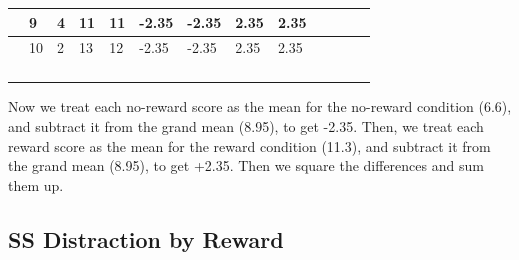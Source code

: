 \documentclass[
]{book}
\begin{document}
\begin{table}
\begin{tabular}{l|l|l|l|l|l|l|l|l|>{}l|>{}l|>{}l|>{}l}
\hline
 & 9 & 4 & 11 & 11 & -2.35 & -2.35 & 2.35 & 2.35 & \cellcolor{yellow}{5.5225} & \cellcolor{yellow}{5.5225} & \cellcolor{yellow}{5.5225} & \cellcolor{yellow}{5.5225}\\
\hline
 & 10 & 2 & 13 & 12 & -2.35 & -2.35 & 2.35 & 2.35 & \cellcolor{yellow}{5.5225} & \cellcolor{yellow}{5.5225} & \cellcolor{yellow}{5.5225} & \cellcolor{yellow}{5.5225}\\
\hline
\cellcolor{lightgreen}{Means} & \cellcolor{lightgreen}{9.6} & \cellcolor{lightgreen}{3.6} & \cellcolor{lightgreen}{12.6} & \cellcolor{lightgreen}{10} & \cellcolor{lightgreen}{} & \cellcolor{lightgreen}{} & \cellcolor{lightgreen}{} & \cellcolor{lightgreen}{} & \cellcolor{yellow}{} & \cellcolor{yellow}{} & \cellcolor{yellow}{} & \cellcolor{yellow}{}\\
\hline
\cellcolor{lightgreen}{Grand Mean} & \cellcolor{lightgreen}{8.95} & \cellcolor{lightgreen}{No Reward} & \cellcolor{lightgreen}{6.6} & \cellcolor{lightgreen}{Reward} & \cellcolor{lightgreen}{11.3} & \cellcolor{lightgreen}{} & \cellcolor{lightgreen}{} & \cellcolor{lightgreen}{} & \cellcolor{yellow}{} & \cellcolor{yellow}{} & \cellcolor{yellow}{} & \cellcolor{yellow}{}\\
\hline
\cellcolor{yellow}{sums} & \cellcolor{yellow}{} & \cellcolor{yellow}{} & \cellcolor{yellow}{} & \cellcolor{yellow}{} & \cellcolor{yellow}{} & \cellcolor{yellow}{} & \cellcolor{yellow}{} & \cellcolor{yellow}{Sums} & \cellcolor{yellow}{27.6125} & \cellcolor{yellow}{27.6125} & \cellcolor{yellow}{27.6125} & \cellcolor{yellow}{27.6125}\\
\hline
\cellcolor{yellow}{SS Reward} & \cellcolor{yellow}{} & \cellcolor{yellow}{} & \cellcolor{yellow}{} & \cellcolor{yellow}{} & \cellcolor{yellow}{} & \cellcolor{yellow}{} & \cellcolor{yellow}{} & \cellcolor{yellow}{SS Reward} & \cellcolor{yellow}{110.45} & \cellcolor{yellow}{} & \cellcolor{yellow}{} & \cellcolor{yellow}{}\\
\hline
\end{tabular}
\end{table}

Now we treat each no-reward score as the mean for the no-reward condition (6.6), and subtract it from the grand mean (8.95), to get -2.35. Then, we treat each reward score as the mean for the reward condition (11.3), and subtract it from the grand mean (8.95), to get +2.35. Then we square the differences and sum them up.

\subsection{SS Distraction by Reward}\label{ss-distraction-by-reward}
\end{document}
